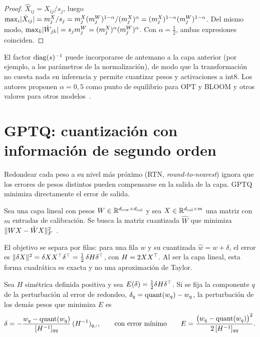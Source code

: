 \begin{proof}
$\hat X_{ij}=X_{ij}/s_j$, luego $\max_i\lvert\hat X_{ij}\rvert=m^{X}_{j}/s_j=m^{X}_{j}(m^{W}_{j})^{1-\alpha}/(m^{X}_{j})^{\alpha}=(m^{X}_{j})^{1-\alpha}(m^{W}_{j})^{1-\alpha}$. Del mismo modo, $\max_k\lvert\hat W_{jk}\rvert=s_jm^{W}_{j}=(m^{X}_{j})^{\alpha}(m^{W}_{j})^{\alpha}$. Con $\alpha=\tfrac12$, ambas expresiones coinciden.
\end{proof}

El factor $\operatorname{diag}(s)^{-1}$ puede incorporarse de antemano a la capa anterior (por ejemplo, a los parámetros de la normalización), de modo que la transformación no cuesta nada en inferencia y permite cuantizar pesos y activaciones a int8. Los autores proponen $\alpha=0{,}5$ como punto de equilibrio para OPT y BLOOM y otros valores para otros modelos~\cite[§4]{smoothquant}.

\section{GPTQ: cuantización con información de segundo orden}

Redondear cada peso a su nivel más próximo (RTN, \emph{round-to-nearest}) ignora que los errores de pesos distintos pueden compensarse en la salida de la capa. GPTQ minimiza directamente el error de salida.

\begin{definicion}\label{def:capas}
Sea una capa lineal con pesos $W\in\mathbb{R}^{d_{\mathrm{row}}\times d_{\mathrm{col}}}$ y sea $X\in\mathbb{R}^{d_{\mathrm{col}}\times m}$ una matriz con $m$ entradas de calibración. Se busca la matriz cuantizada $\hat W$ que minimiza $\lVert WX-\hat WX\rVert_F^{2}$~\cite[§3, ec.~1]{gptq}.
\end{definicion}

El objetivo se separa por filas: para una fila $w$ y su cuantizada $\hat w=w+\delta$, el error es $\lVert\delta X\rVert^{2}=\delta XX^{\top}\delta^{\top}=\tfrac12\,\delta H\delta^{\top}$, con $H=2XX^{\top}$. Al ser la capa lineal, esta forma cuadrática es exacta y no una aproximación de Taylor.

\begin{teorema}\label{teo:obs}
Sea $H$ simétrica definida positiva y sea $E(\delta)=\tfrac12\delta H\delta^{\top}$. Si se fija la componente $q$ de la perturbación al error de redondeo, $\delta_q=\operatorname{quant}(w_q)-w_q$, la perturbación de los demás pesos que minimiza $E$ es
\[
\delta=-\frac{w_q-\operatorname{quant}(w_q)}{[H^{-1}]_{qq}}\,(H^{-1})_{q,:},
\qquad\text{con error mínimo}\qquad E=\frac{\bigl(w_q-\operatorname{quant}(w_q)\bigr)^{2}}{2\,[H^{-1}]_{qq}}.
\]
\end{teorema}

